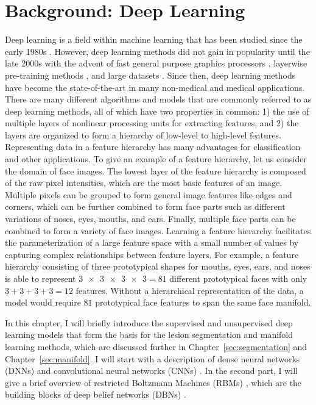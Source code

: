 \chapter{Background: Deep Learning}

Deep learning is a field within machine learning that has been studied since the
early 1980s \citep{fukushima1980}. However, deep learning methods did not gain
in popularity until the late 2000s with the advent of fast general purpose
graphics processors \citep{raina2009}, layerwise pre-training methods
\citep{hinton2006b,hinton2006c}, and large datasets
\citep{deng2009,krizhevsky2012}. Since then, deep learning methods have become
the state-of-the-art in many non-medical \citep{krizhevsky2012,sainath2013} and
medical \citep{ciresan2012,kamnitsas2015} applications. There are many different
algorithms and models that are commonly referred to as deep learning methods,
all of which have two properties in common: 1) the use of multiple layers of
nonlinear processing units for extracting features, and 2) the layers are
organized to form a hierarchy of low-level to high-level features. Representing
data in a feature hierarchy has many advantages for classification and other
applications. To give an example of a feature hierarchy, let us consider the
domain of face images. The lowest layer of the feature hierarchy is composed of
the raw pixel intensities, which are the most basic features of an image.
Multiple pixels can be grouped to form general image features like edges and
corners, which can be further combined to form face parts such as different
variations of noses, eyes, mouths, and ears.
Finally, multiple face parts can be combined to form a variety of face images.
Learning a feature hierarchy facilitates the parameterization of a large feature
space with a small number of values by capturing complex relationships between
feature layers. For example, a feature hierarchy consisting of three
prototypical shapes for mouths, eyes, ears, and noses is able to represent
$\num{3x3x3x3} = 81$ different prototypical faces with only $3+3+3+3=12$
features. Without a hierarchical representation of the data, a model would
require $81$ prototypical face features to span the same face manifold.

In this chapter, I will briefly introduce the supervised and unsupervised deep
learning models that form the basis for the lesion segmentation and manifold
learning methods, which are discussed further in Chapter~\ref{sec:segmentation}
and Chapter~\ref{sec:manifold}. I will start with a description of dense neural
networks (DNNs) \citep{farley1954,werbos1974,rumelhart1986} and convolutional
neural networks (CNNs) \citep{fukushima1980,lecun1989,lecun1998}. In the second
part, I will give a brief overview of restricted Boltzmann Machines (RBMs)
\citep{freund1992,hinton2010a}, which are the building blocks of deep belief
networks (DBNs) \citep{hinton2006b}.

